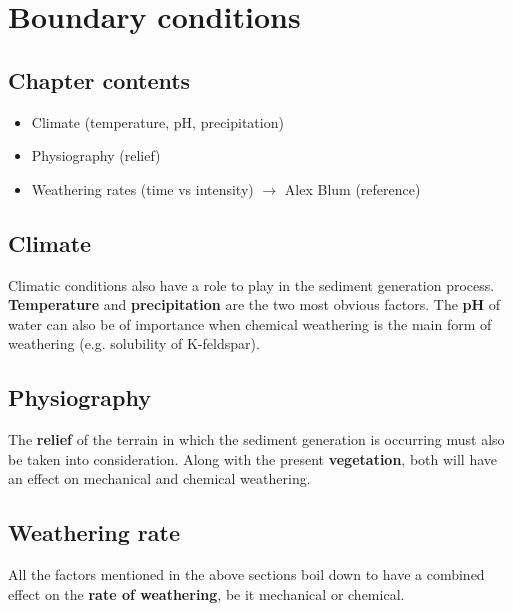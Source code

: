 \chapter{Boundary conditions}\label{ch:boundary_conditions}

\section{Chapter contents}
\begin{itemize}
    \item Climate (temperature, pH, precipitation)
    \item Physiography (relief)
    \item Weathering rates (time vs intensity) \(\rightarrow\) Alex Blum (reference)

\end{itemize}

\section{Climate}
    Climatic conditions also have a role to play in the sediment generation process. %
    \textbf{Temperature} and \textbf{precipitation} are the two most obvious factors.
    The \textbf{pH} of water can also be of importance when chemical weathering is the main form of weathering (e.g. solubility of K-feldspar). %

\section{Physiography}
    The \textbf{relief} of the terrain in which the sediment generation is occurring must also be taken into consideration. %
    Along with the present \textbf{vegetation}, both will have an effect on mechanical and chemical weathering. %

\section{Weathering rate}
    All the factors mentioned in the above sections boil down to have a combined effect on the \textbf{rate of weathering}, be it mechanical or chemical. %


\cleardoublepage

